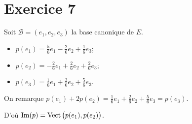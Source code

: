 \part{Exercice 7}

Soit $\mathcal{B} = (e_1,e_2,e_3)$ la base canonique de $E$.

\begin{itemize}
	\item $p(e_1) = \frac{5}{6}e_1 -\frac{2}{6} e_2 + \frac{1}{6}e_3$;
	\item $p(e_2) = -\frac{2}{6}e_1 + \frac{2}{6} e_2 + \frac{2}{6}e_3$;
	\item $p(e_3) = \frac{1}{6}e_1 + \frac{2}{6}e_2 + \frac{5}{6}e_3$.
\end{itemize}

On remarque $p(e_1) + 2p(e_2) = \frac{1}{6}e_1 + \frac{2}{6}e_2 + \frac{5}{6}e_3 = p(e_3)$.

D'où $\mathrm{Im}(p) = \operatorname{Vect}\big(p(e_1),p(e_2)\big)$.

